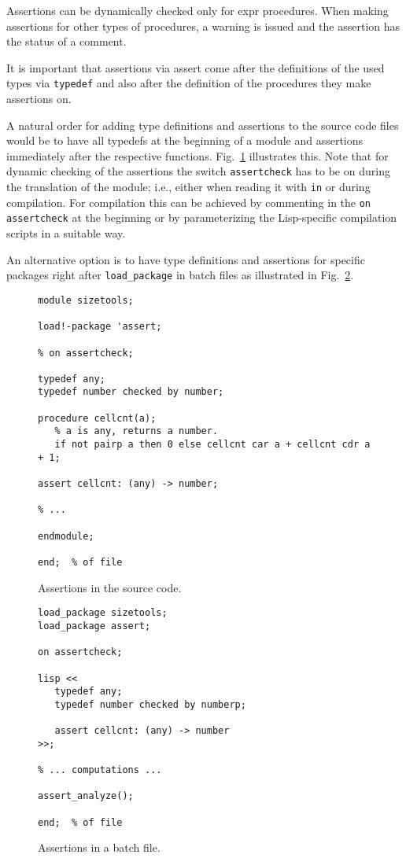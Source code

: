 Assertions can be dynamically checked only for expr procedures. When
making assertions for other types of procedures, a warning is issued and
the assertion has the status of a comment.

It is important that assertions via assert come after the definitions of
the used types via \texttt{typedef} and also after the definition of the
procedures they make assertions on.

A natural order for adding type definitions and assertions to the source
code files would be to have all typedefs at the beginning of a module
and assertions immediately after the respective functions.
Fig.~\ref{FIG:assMod} illustrates this. Note that for dynamic checking
of the assertions the switch \texttt{assertcheck} has to be on during
the translation of the module; i.e., either when reading it with
\texttt{in} or during compilation. For compilation this can be achieved
by commenting in the \texttt{on assertcheck} at the beginning or by
parameterizing the Lisp-specific compilation scripts in a suitable way.

An alternative option is to have type definitions and assertions for
specific packages right after \texttt{load\_package} in batch files as
illustrated in Fig.~\ref{FIG:assBat}.
\begin{figure}
  \begin{small}
\begin{verbatim}
module sizetools;

load!-package 'assert;

% on assertcheck;

typedef any;
typedef number checked by number;

procedure cellcnt(a);
   % a is any, returns a number.
   if not pairp a then 0 else cellcnt car a + cellcnt cdr a + 1;

assert cellcnt: (any) -> number;

% ...

endmodule;

end;  % of file
\end{verbatim}
  \end{small}
  \caption{Assertions in the source code.}\label{FIG:assMod}
\end{figure}

\begin{figure}
  \begin{small}
\begin{verbatim}
load_package sizetools;
load_package assert;

on assertcheck;

lisp <<
   typedef any;
   typedef number checked by numberp;

   assert cellcnt: (any) -> number
>>;

% ... computations ...

assert_analyze();

end;  % of file
\end{verbatim}
  \end{small}
  \caption{Assertions in a batch file.}\label{FIG:assBat}
\end{figure}

